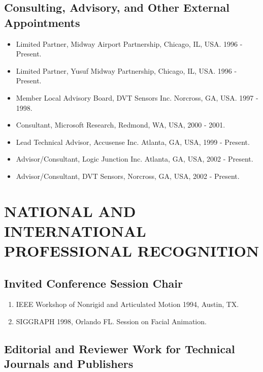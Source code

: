 \subsection{Consulting, Advisory, and Other External Appointments}
\label{subsec:consultant}

\begin{itemize}
\item{Limited Partner, Midway Airport Partnership, Chicago, IL, USA. 1996 - Present.}
\item{Limited Partner, Yusuf Midway Partnership, Chicago, IL, USA. 1996 - Present.}
\item{Member Local Advisory Board, DVT Sensors Inc. Norcross, GA, USA. 1997 - 1998.}
\item{Consultant, Microsoft Research, Redmond, WA, USA, 2000 - 2001.}
\item{Lead Technical Advisor, Accusense Inc. Atlanta, GA, USA, 1999 - Present.}
\item{Advisor/Consultant, Logic Junction Inc. Atlanta, GA, USA, 2002 - Present.}
\item{Advisor/Consultant, DVT Sensors, Norcross, GA, USA, 2002 - Present.}

\end{itemize}

\section{NATIONAL AND INTERNATIONAL PROFESSIONAL RE\-CO\-GNITION}
\label{sec:national}

\subsection{Invited Conference Session Chair}
\label{subsec:invited}

\begin{enumerate}

\item IEEE Workshop of Nonrigid and Articulated Motion 1994,
Austin, TX.
\item SIGGRAPH 1998, Orlando FL. Session on Facial Animation.

\end{enumerate}

\subsection{Editorial and Reviewer Work for Technical Journals and Publishers}
\label{subsec:editorial}

